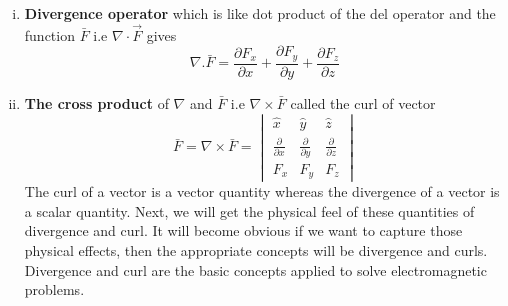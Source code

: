 \begin{enumerate}[(i)]
\item \textbf{Divergence operator} which is like dot product of the del operator and the function $\bar{F}$ i.e $\nabla\cdot\overrightarrow{F}$ gives
\begin{equation}
\nabla.\bar{F} = \frac{\partial F_{x}}{\partial x} + \frac{\partial F_{y}}{\partial y} + \frac{\partial F_{z}}{\partial z}
\end{equation}
\item \textbf{The cross product} of $\nabla$ and $\bar{F}$ i.e $\nabla \times \bar{F}$ called the curl of vector
\begin{dmath*}
\bar{F} = \nabla \times \bar{F} = 
\begin{vmatrix}
\hat{x} & \hat{y} & \hat{z}\\
\frac{\partial}{\partial x} & \frac{\partial}{\partial y} & \frac{\partial}{\partial z}\\
F_{x} & F_{y} & F_{z}
\end{vmatrix}
\end{dmath*}
The curl of a vector is a vector quantity whereas the divergence of a vector is a scalar quantity. Next, we will get the physical feel of these quantities of divergence and curl. It will become obvious if we want to capture those physical effects, then the appropriate concepts will be divergence and curls. Divergence and curl are the basic concepts applied to solve electromagnetic problems.
\end{enumerate}


